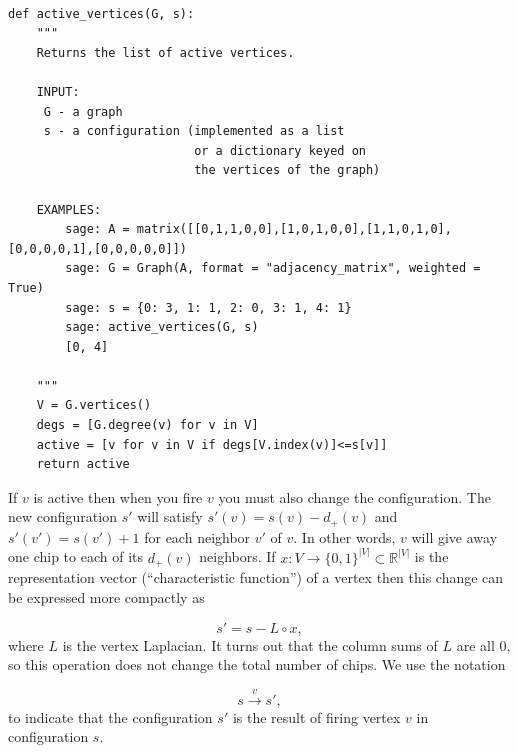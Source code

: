 \begin{Verbatim}[fontsize=\scriptsize,fontfamily=courier,fontshape=tt,frame=single,label=\sage]

def active_vertices(G, s):
    """
    Returns the list of active vertices.

    INPUT:
     G - a graph
     s - a configuration (implemented as a list 
                          or a dictionary keyed on
                          the vertices of the graph)

    EXAMPLES:
        sage: A = matrix([[0,1,1,0,0],[1,0,1,0,0],[1,1,0,1,0],[0,0,0,0,1],[0,0,0,0,0]])
        sage: G = Graph(A, format = "adjacency_matrix", weighted = True)
        sage: s = {0: 3, 1: 1, 2: 0, 3: 1, 4: 1}
        sage: active_vertices(G, s)
        [0, 4]

    """
    V = G.vertices()
    degs = [G.degree(v) for v in V]
    active = [v for v in V if degs[V.index(v)]<=s[v]]
    return active

\end{Verbatim}
If $v$ is active then when you fire $v$ you must also change the
configuration. The new configuration $s'$ will satisfy
$s'(v) = s(v)-d_+(v)$ and $s'(v')=s(v')+1$ for each 
neighbor $v'$ of $v$. In other words, $v$ will give away one chip to
each of its $d_+(v)$ neighbors. If $x:V\to \{0,1\}^{|V|}\subset {\mathbb{R}}^{|V|}$ is
the representation vector (``characteristic function'') of a vertex
then this change can be expressed more compactly as

\begin{equation}
\label{eqn:fire}
s'= s-L\circ x,
\end{equation}
where $L$ is the vertex Laplacian. It turns out that the column sums
of $L$ are all $0$, so this operation does not change the total
number of chips. We use the notation

\[ 
s\overset{v}{\to} s',
\] 
to indicate that the configuration $s'$ is the
result of firing vertex $v$ in configuration $s$.

